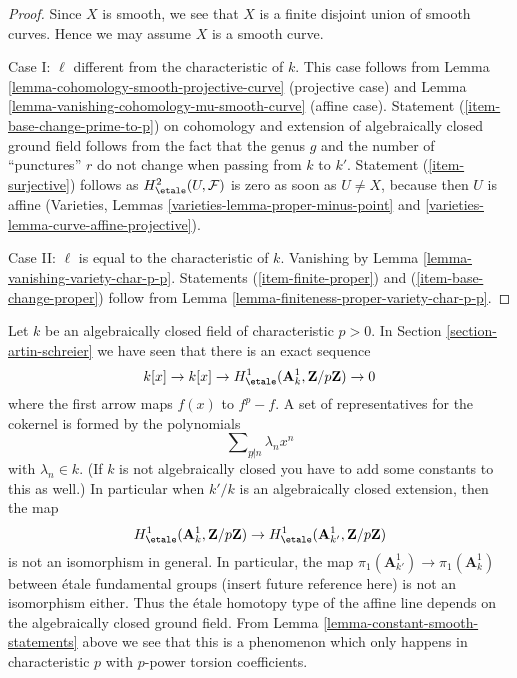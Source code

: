 \begin{proof}
Since $X$ is smooth, we see that $X$ is a finite disjoint union of
smooth curves. Hence we may assume $X$ is a smooth curve.

\medskip\noindent
Case I: $\ell$ different from the characteristic of $k$.
This case follows from
Lemma \ref{lemma-cohomology-smooth-projective-curve}
(projective case) and
Lemma \ref{lemma-vanishing-cohomology-mu-smooth-curve}
(affine case). Statement (\ref{item-base-change-prime-to-p})
on cohomology and extension of algebraically closed ground
field follows from the fact that the genus $g$ and the number
of ``punctures'' $r$ do not change when passing from $k$ to $k'$.
Statement (\ref{item-surjective}) follows as $H^2_\etale(U, \mathcal{F})$
is zero as soon as $U \not = X$, because then $U$ is affine
(Varieties, Lemmas \ref{varieties-lemma-proper-minus-point} and
\ref{varieties-lemma-curve-affine-projective}).

\medskip\noindent
Case II: $\ell$ is equal to the characteristic of $k$.
Vanishing by Lemma \ref{lemma-vanishing-variety-char-p-p}.
Statements (\ref{item-finite-proper}) and (\ref{item-base-change-proper})
follow from
Lemma \ref{lemma-finiteness-proper-variety-char-p-p}.
\end{proof}

\begin{remark}
\label{remark-invariance}
Let $k$ be an algebraically closed field of characteristic $p > 0$.
In Section \ref{section-artin-schreier} we have seen that there is
an exact sequence
$$
k[x] \to k[x] \to
H^1_\etale(\mathbf{A}^1_k, \mathbf{Z}/p\mathbf{Z}) \to 0
$$
where the first arrow maps $f(x)$ to $f^p - f$. A set of representatives
for the cokernel is formed by the polynomials
$$
\sum\nolimits_{p \not | n} \lambda_n x^n
$$
with $\lambda_n \in k$. (If $k$ is not algebraically closed
you have to add some constants to this as well.) In particular
when $k'/k$ is an algebraically closed extension, then
the map
$$
H^1_\etale(\mathbf{A}^1_k, \mathbf{Z}/p\mathbf{Z})
\to
H^1_\etale(\mathbf{A}^1_{k'}, \mathbf{Z}/p\mathbf{Z})
$$
is not an isomorphism in general. In particular, the map
$\pi_1(\mathbf{A}^1_{k'}) \to \pi_1(\mathbf{A}^1_k)$
between \'etale fundamental groups (insert future reference here)
is not an isomorphism either. Thus the \'etale homotopy type
of the affine line depends on the algebraically closed ground field.
From Lemma \ref{lemma-constant-smooth-statements} above we see that
this is a phenomenon which only happens in characteristic $p$
with $p$-power torsion coefficients.
\end{remark}

